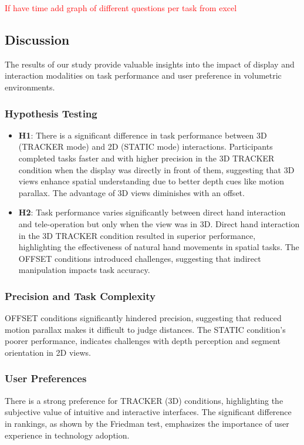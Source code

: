\textcolor{red}{If have time add graph of different questions per task from excel}

\subsection{Discussion}

The results of our study provide valuable insights into the impact of display and interaction modalities on task performance and user preference in volumetric environments.

\subsubsection{Hypothesis Testing}
\begin{itemize}
	\item \textbf{H1}: There is a significant difference in task performance between 3D (TRACKER mode) and 2D (STATIC mode) interactions. Participants completed tasks faster and with higher precision in the 3D TRACKER condition when the display was directly in front of them, suggesting that 3D views enhance spatial understanding due to better depth cues like motion parallax. The advantage of 3D views diminishes with an offset.\\
	\item \textbf{H2}: Task performance varies significantly between direct hand interaction and tele-operation but only when the view was in 3D. Direct hand interaction in the 3D TRACKER condition resulted in superior performance, highlighting the effectiveness of natural hand movements in spatial tasks. The OFFSET conditions introduced challenges, suggesting that indirect manipulation impacts task accuracy.
\end{itemize}

\subsubsection{Precision and Task Complexity}
OFFSET conditions significantly hindered precision, suggesting that reduced motion parallax makes it difficult to judge distances. The STATIC condition's poorer performance, indicates challenges with depth perception and segment orientation in 2D views. 

\subsubsection{User Preferences}
There is a strong preference for TRACKER (3D) conditions, highlighting the subjective value of intuitive and interactive interfaces. The significant difference in rankings, as shown by the Friedman test, emphasizes the importance of user experience in technology adoption.

